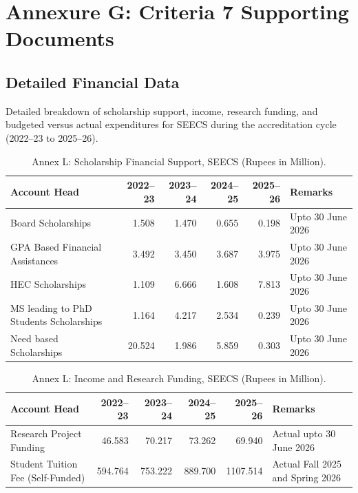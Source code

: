 \clearpage
\setcounter{section}{0}
\renewcommand{\thesection}{G.\arabic{section}}
\renewcommand{\theHsection}{annexG.\arabic{section}}

\chapter*{Annexure G: Criteria 7 Supporting Documents}
{}
\label{app:criteria-7}
\section{Detailed Financial Data}
\label{annex:L}

\noindent
Detailed breakdown of scholarship support, income, research funding, and budgeted versus
actual expenditures for SEECS during the accreditation cycle (2022--23 to 2025--26).

\begin{table}[H]
\centering
\caption{Annex L: Scholarship Financial Support, SEECS (Rupees in Million).}
\label{tab:annexL_scholarships}
\begingroup\small
\begin{tabular}{>{\raggedright\arraybackslash}p{}rrrr>{\raggedright\arraybackslash}p{}}
\toprule
\textbf{Account Head} & \textbf{2022--23} & \textbf{2023--24} & \textbf{2024--25} & \textbf{2025--26} & \textbf{Remarks} \\
\midrule
Board Scholarships & 1.508 & 1.470 & 0.655 & 0.198 & Upto 30 June 2026 \\
GPA Based Financial Assistances & 3.492 & 3.450 & 3.687 & 3.975 & Upto 30 June 2026 \\
HEC Scholarships & 1.109 & 6.666 & 1.608 & 7.813 & Upto 30 June 2026 \\
MS leading to PhD Students Scholarships & 1.164 & 4.217 & 2.534 & 0.239 & Upto 30 June 2026 \\
Need based Scholarships & 20.524 & 1.986 & 5.859 & 0.303 & Upto 30 June 2026 \\
\bottomrule
\end{tabular}
\endgroup
\end{table}

\begin{table}[H]
\centering
\caption{Annex L: Income and Research Funding, SEECS (Rupees in Million).}
\label{tab:annexL_income}
\begingroup\small
\begin{tabular}{>{\raggedright\arraybackslash}p{}rrrr>{\raggedright\arraybackslash}p{}}
\toprule
\textbf{Account Head} & \textbf{2022--23} & \textbf{2023--24} & \textbf{2024--25} & \textbf{2025--26} & \textbf{Remarks} \\
\midrule
Research Project Funding & 46.583 & 70.217 & 73.262 & 69.940 & Actual upto 30 June 2026 \\
Student Tuition Fee (Self-Funded) & 594.764 & 753.222 & 889.700 & 1107.514 & Actual Fall 2025 and Spring 2026 \\
\bottomrule
\end{tabular}
\endgroup
\end{table}


